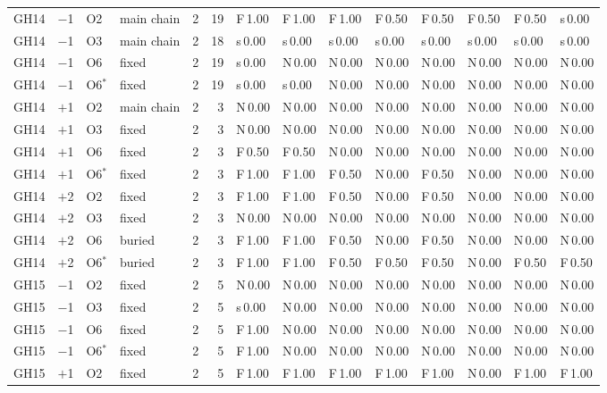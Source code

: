 \documentclass[preprint,12pt]{elsarticle}
\begin{document}
{\begin{longtable}{llllrrllllllll}
GH14 & $-$1 & O2 & main chain & 2 & 19 & F\,1.00 & F\,1.00 & F\,1.00 & F\,0.50 & F\,0.50 & F\,0.50 & F\,0.50 & s\,0.00\\
GH14 & $-$1 & O3 & main chain & 2 & 18 & s\,0.00 & s\,0.00 & s\,0.00 & s\,0.00 & s\,0.00 & s\,0.00 & s\,0.00 & s\,0.00\\
GH14 & $-$1 & O6 & fixed & 2 & 19 & s\,0.00 & N\,0.00 & N\,0.00 & N\,0.00 & N\,0.00 & N\,0.00 & N\,0.00 & N\,0.00\\
GH14 & $-$1 & O6$^\ast$ & fixed & 2 & 19 & s\,0.00 & s\,0.00 & N\,0.00 & N\,0.00 & N\,0.00 & N\,0.00 & N\,0.00 & N\,0.00\\
GH14 & $+$1 & O2 & main chain & 2 & 3 & N\,0.00 & N\,0.00 & N\,0.00 & N\,0.00 & N\,0.00 & N\,0.00 & N\,0.00 & N\,0.00\\
GH14 & $+$1 & O3 & fixed & 2 & 3 & N\,0.00 & N\,0.00 & N\,0.00 & N\,0.00 & N\,0.00 & N\,0.00 & N\,0.00 & N\,0.00\\
GH14 & $+$1 & O6 & fixed & 2 & 3 & F\,0.50 & F\,0.50 & N\,0.00 & N\,0.00 & N\,0.00 & N\,0.00 & N\,0.00 & N\,0.00\\
GH14 & $+$1 & O6$^\ast$ & fixed & 2 & 3 & F\,1.00 & F\,1.00 & F\,0.50 & N\,0.00 & F\,0.50 & N\,0.00 & N\,0.00 & N\,0.00\\
GH14 & $+$2 & O2 & fixed & 2 & 3 & F\,1.00 & F\,1.00 & F\,0.50 & N\,0.00 & F\,0.50 & N\,0.00 & N\,0.00 & N\,0.00\\
GH14 & $+$2 & O3 & fixed & 2 & 3 & N\,0.00 & N\,0.00 & N\,0.00 & N\,0.00 & N\,0.00 & N\,0.00 & N\,0.00 & N\,0.00\\
GH14 & $+$2 & O6 & buried & 2 & 3 & F\,1.00 & F\,1.00 & F\,0.50 & N\,0.00 & F\,0.50 & N\,0.00 & N\,0.00 & N\,0.00\\
GH14 & $+$2 & O6$^\ast$ & buried & 2 & 3 & F\,1.00 & F\,1.00 & F\,0.50 & F\,0.50 & F\,0.50 & N\,0.00 & F\,0.50 & F\,0.50\\
\addlinespace
GH15 & $-$1 & O2 & fixed & 2 & 5 & N\,0.00 & N\,0.00 & N\,0.00 & N\,0.00 & N\,0.00 & N\,0.00 & N\,0.00 & N\,0.00\\
GH15 & $-$1 & O3 & fixed & 2 & 5 & s\,0.00 & N\,0.00 & N\,0.00 & N\,0.00 & N\,0.00 & N\,0.00 & N\,0.00 & N\,0.00\\
GH15 & $-$1 & O6 & fixed & 2 & 5 & F\,1.00 & N\,0.00 & N\,0.00 & N\,0.00 & N\,0.00 & N\,0.00 & N\,0.00 & N\,0.00\\
GH15 & $-$1 & O6$^\ast$ & fixed & 2 & 5 & F\,1.00 & N\,0.00 & N\,0.00 & N\,0.00 & N\,0.00 & N\,0.00 & N\,0.00 & N\,0.00\\
GH15 & $+$1 & O2 & fixed & 2 & 5 & F\,1.00 & F\,1.00 & F\,1.00 & F\,1.00 & F\,1.00 & N\,0.00 & F\,1.00 & F\,1.00\\

\end{longtable}}
\end{document}
